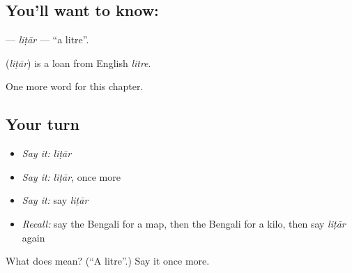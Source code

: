 \subsection*{You'll want to know: }
\textbf{} — \emph{liṭār} — \textquotedblleft{}a litre\textquotedblright{}.

\begin{cousinweb}
\textbf{} (\emph{liṭār}) is a loan from English \emph{litre}.
\end{cousinweb}

\begin{grammarlens}[title={What you've built}]
One more word for this chapter.
\end{grammarlens}

\subsection*{Your turn}
\begin{itemize}
\raggedright
  \item \emph{Say it:} \emph{liṭār}
  \item \emph{Say it:} \emph{liṭār}, once more
  \item \emph{Say it:} say \emph{liṭār}
  \item \emph{Recall:} say the Bengali for a map, then the Bengali for a kilo, then say \emph{liṭār} again
\end{itemize}

\begin{tcolorbox}[breakable,colback=teal!4,colframe=teal!35!black,title={Before you move on}]
What does  mean? (\textquotedblleft{}A litre\textquotedblright{}.) Say it once more.
\end{tcolorbox}
